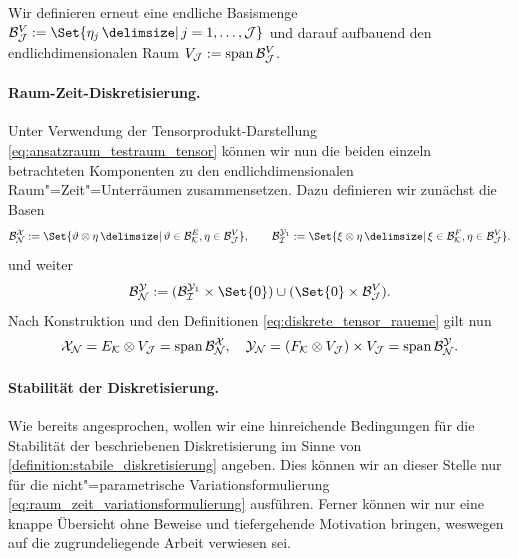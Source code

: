 \documentclass[../main.tex]{subfiles}
\begin{document}
Wir definieren erneut eine endliche Basismenge $\mathcal B^{V}_{\mathcal J} := \Set{ \eta_{j} \given j = 1, \dots, \mathcal J}$ und darauf aufbauend den endlichdimensionalen Raum $V_{\mathcal J} := \operatorname{span} \mathcal B^{V}_{\mathcal J}$.


\paragraph{Raum-Zeit-Diskretisierung.} %
\label{par:raum_zeit_diskretisierung}

Unter Verwendung der Tensorprodukt-Darstellung \cref{eq:ansatzraum_testraum_tensor} können wir nun die beiden einzeln betrachteten Komponenten zu den endlichdimensionalen Raum"=Zeit"=Unterräumen zusammensetzen.
Dazu definieren wir zunächst die Basen
\begin{equation}
\label{eq:diskreter_ansatzraum_basis_phi}
\label{eq:diskreter_testraum_basis_psi1}
    \mathcal B^{\mathcal X}_{\mathcal N} := \Set{\theta \otimes \eta \given \theta \in \mathcal B^{E}_{\mathcal K}, \eta \in \mathcal B^{V}_{\mathcal J}},
    \qquad
    \mathcal B^{\mathcal Y_{1}}_{\mathcal I} := \Set{\xi \otimes \eta \given \xi \in \mathcal B^{F}_{\mathcal K}, \eta \in \mathcal B^{V}_{\mathcal J}}.
\end{equation}
und weiter
\begin{equation}
\label{eq:diskreter_testraum_basis_psi}
    \mathcal B^{\mathcal Y}_{\mathcal N} := (\mathcal B^{\mathcal Y_{1}}_{\mathcal I} \times \Set{ 0 }) \cup (\Set{0} \times \mathcal B^{V}_{\mathcal J}).
\end{equation}
Nach Konstruktion und den Definitionen \cref{eq:diskrete_tensor_raueme} gilt nun
\begin{equation}
    \label{eq:diskreter_ansatz_und_testraum_als_span}
    \mathcal X_{\mathcal N} = E_{\mathcal K} \otimes V_{\mathcal J} = \operatorname{span} \mathcal B^{\mathcal X}_{\mathcal N},
    \quad
    \mathcal Y_{\mathcal N} = (F_{\mathcal K} \otimes V_{\mathcal J}) \times V_{\mathcal J} = \operatorname{span} \mathcal B^{\mathcal Y}_{\mathcal N}.
\end{equation}


\paragraph{Stabilität der Diskretisierung.} %
\label{par:stabilit_t_der_diskretisierung}

Wie bereits angesprochen, wollen wir eine hinreichende Bedingungen für die Stabilität der beschriebenen Diskretisierung im Sinne von \cref{definition:stabile_diskretisierung} angeben.
Dies können wir an dieser Stelle nur für die nicht"=parametrische Variationsformulierung \cref{eq:raum_zeit_variationsformulierung} ausführen.
Ferner können wir nur eine knappe Übersicht ohne Beweise und tiefergehende Motivation bringen, weswegen auf die zugrundeliegende Arbeit \cite[Section 5.2]{Andreev:2012ep} verwiesen sei.
\end{document}
